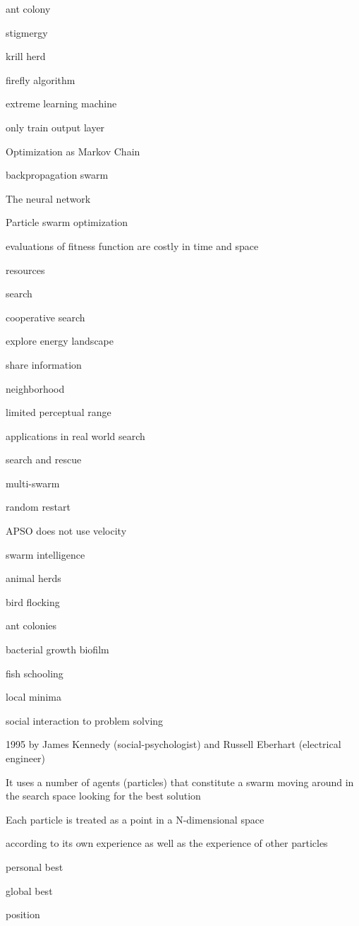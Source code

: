 \documentclass[8pt,journal,compsoc]{IEEEtran}
\begin{document}
ant colony  

stigmergy 

krill herd 

firefly algorithm 

extreme learning machine 

only train output layer 

Optimization as Markov Chain

backpropagation swarm

The neural network

Particle swarm optimization

evaluations of fitness function are costly in time and space 

resources 

search 

cooperative search

explore energy landscape 

share information 

neighborhood

limited perceptual range

applications in real world search 

search and rescue 

multi-swarm 

random restart

APSO does not use velocity

swarm intelligence 

animal herds

bird flocking 

ant colonies 

bacterial growth biofilm 

fish schooling 

local minima

social interaction to problem solving

1995 by James Kennedy (social-psychologist) and Russell Eberhart (electrical engineer)

It uses a number of agents (particles) that constitute a swarm moving around in the search space looking for the best solution

Each particle is treated as a point in a N-dimensional space 

according to its own experience as well as the experience of other particles

personal best 

global best 

position
 
\end{document}
